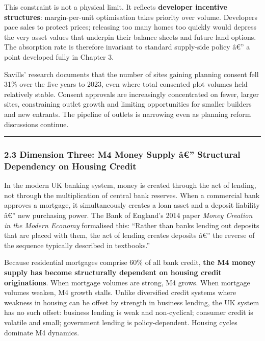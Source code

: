 This constraint is not a physical limit. It reflects \textbf{developer
incentive structures}: margin-per-unit optimisation takes priority over
volume. Developers pace sales to protect prices; releasing too many
homes too quickly would depress the very asset values that underpin
their balance sheets and future land options. The absorption rate is
therefore invariant to standard supply-side policy â€'' a point
developed fully in Chapter 3.

Savills' research documents that the number of sites gaining planning
consent fell 31\% over the five years to 2023, even where total
consented plot volumes held relatively stable. Consent approvals are
increasingly concentrated on fewer, larger sites, constraining outlet
growth and limiting opportunities for smaller builders and new entrants.
The pipeline of outlets is narrowing even as planning reform discussions
continue.

\begin{center}\rule{0.5\linewidth}{0.5pt}\end{center}

\subsubsection{2.3 Dimension Three: M4 Money Supply â€'' Structural
Dependency on Housing
Credit}\label{dimension-three-m4-money-supply-uxe2-structural-dependency-on-housing-credit}

In the modern UK banking system, money is created through the act of
lending, not through the multiplication of central bank reserves. When a
commercial bank approves a mortgage, it simultaneously creates a loan
asset and a deposit liability â€'' new purchasing power. The Bank of
England's 2014 paper \emph{Money Creation in the Modern Economy}
formalised this: ``Rather than banks lending out deposits that are
placed with them, the act of lending creates deposits â€'' the reverse
of the sequence typically described in textbooks.''

Because residential mortgages comprise 60\% of all bank credit,
\textbf{the M4 money supply has become structurally dependent on housing
credit originations}. When mortgage volumes are strong, M4 grows. When
mortgage volumes weaken, M4 growth stalls. Unlike diversified credit
systems where weakness in housing can be offset by strength in business
lending, the UK system has no such offset: business lending is weak and
non-cyclical; consumer credit is volatile and small; government lending
is policy-dependent. Housing cycles dominate M4 dynamics.

